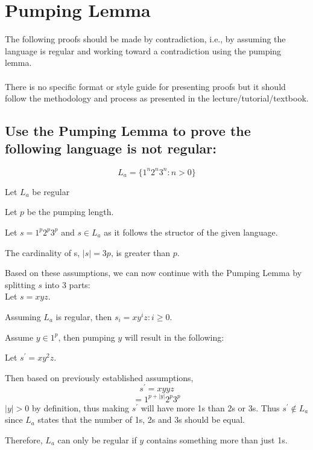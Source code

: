 \documentclass[12pt]{article}
\begin{document}
    \pagebreak

    \section{Pumping Lemma}
    The following proofs should be made by contradiction, i.e., 
    by assuming the language is regular and working toward a contradiction using the pumping lemma.
    \\ \\
    There is no specific format or style guide for presenting 
    proofs but it should follow the methodology and process as presented in 
    the lecture/tutorial/textbook.
        
    \pagebreak

    \subsection{Use the Pumping Lemma to prove the following language is not regular:}
        \[L_a = \{1^n2^n3^n:n>0\}\]
        
        Let $L_a$ be regular

        Let $p$ be the pumping length.

        Let $s = 1^p2^p3^p$ and $s \in L_a$ as it follows the structor of the 
        given language.
        
        The cardinality of s, $|s| = 3p$, is greater than $p$.
        
        Based on these assumptions, we can now continue with the Pumping Lemma
        by splitting $s$ into 3 parts: \\ Let $s = xyz$.

        Assuming $L_a$ is regular, then $s_i = xy^iz : i \geq 0$. 
        
        Assume $y \in 1^p$, then pumping $y$ will result in the following:

        \begin{center}
            Let $s^'=xy^2z$.

            Then based on previously established assumptions,
            \[s^' = xyyz\]
            \[= 1^{p + |y|} 2^p3^p\]
            $|y| > 0$ by definition, thus making $s^'$ will have more 1s than 2s or 3s. 
            Thus $s^' \notin L_a$ since $L_a$ states that the number of 1s, 2s and 3s should be equal. 
        \end{center}

        Therefore, $L_a$ can only be regular if $y$ contains something more than just 1s.
\end{document}
